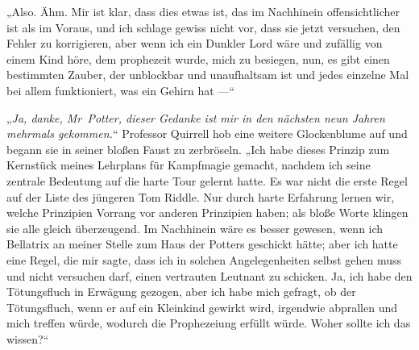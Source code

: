 „Also. Ähm. Mir ist klar, dass dies etwas ist, das im Nachhinein offensichtlicher ist als im Voraus, und ich schlage gewiss nicht vor, dass sie jetzt versuchen, den Fehler zu korrigieren, aber wenn ich ein Dunkler Lord wäre und zufällig von einem Kind höre, dem prophezeit wurde, mich zu besiegen, nun, es gibt einen bestimmten Zauber, der unblockbar und unaufhaltsam ist und jedes einzelne Mal bei allem funktioniert, was ein Gehirn hat —“

„\emph{Ja, danke, Mr~Potter, dieser Gedanke ist mir in den nächsten neun Jahren mehrmals gekommen.}“
Professor Quirrell hob eine weitere Glockenblume auf und begann sie in seiner bloßen Faust zu zerbröseln.
„Ich habe dieses Prinzip zum Kernstück meines Lehrplans für Kampfmagie gemacht, nachdem ich seine zentrale Bedeutung auf die harte Tour gelernt hatte. Es war nicht die erste Regel auf der Liste des jüngeren Tom Riddle. Nur durch harte Erfahrung lernen wir, welche Prinzipien Vorrang vor anderen Prinzipien haben; als bloße Worte klingen sie alle gleich überzeugend. Im Nachhinein wäre es besser gewesen, wenn ich Bellatrix an meiner Stelle zum Haus der Potters geschickt hätte; aber ich hatte eine Regel, die mir sagte, dass ich in solchen Angelegenheiten selbst gehen muss und nicht versuchen darf, einen vertrauten Leutnant zu schicken. Ja, ich habe den Tötungsfluch in Erwägung gezogen, aber ich habe mich gefragt, ob der Tötungsfluch, wenn er auf ein Kleinkind gewirkt wird, irgendwie abprallen und mich treffen würde, wodurch die Prophezeiung erfüllt würde. Woher sollte ich das wissen?“

